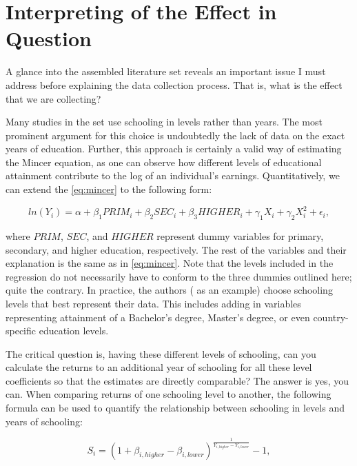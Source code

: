 \section{Interpreting of the Effect in Question}
\label{sec:effect_meaning}

A glance into the assembled literature set reveals an important issue I must address before explaining the data collection process. That is, what is the effect that we are collecting?

Many studies in the set \citep{sackey2008private, leigh2008returns, bartolj2013evolution} use schooling in levels rather than years. The most prominent argument for this choice is undoubtedly the lack of data on the exact years of education. Further, this approach is certainly a valid way of estimating the Mincer equation, as one can observe how different levels of educational attainment contribute to the log of an individual's earnings. Quantitatively, we can extend the \autoref{eq:mincer} to the following form:

\begin{equation}
    \label{eq:mincer_levels}
    ln(Y_i) = \alpha + \beta_{1}PRIM_i + \beta_{2}SEC_i + \beta_{3}HIGHER_i + \gamma_{1}X_i + \gamma_{2}X_{i}^2 + \epsilon_i,
\end{equation}

where $PRIM$, $SEC$, and $HIGHER$ represent dummy variables for primary, secondary, and higher education, respectively. The rest of the variables and their explanation is the same as in \autoref{eq:mincer}. Note that the levels included in the regression do not necessarily have to conform to the three dummies outlined here; quite the contrary. In practice, the authors (\cite{gill2000community} as an example) choose schooling levels that best represent their data. This includes adding in variables representing attainment of a Bachelor's degree, Master's degree, or even country-specific education levels.

The critical question is, having these different levels of schooling, can you calculate the returns to an additional year of schooling for all these level coefficients so that the estimates are directly comparable? The answer is yes, you can. When comparing returns of one schooling level to another, the following formula can be used to quantify the relationship between schooling in levels and years of schooling:

\begin{equation}
\label{eq:schooling_levels}
    S_i = \left(1 + \beta_{i, higher} - \beta_{i, lower}\right)^{\frac{1}{Y_{i, higher} - Y_{i, lower}}} - 1,
\end{equation}

